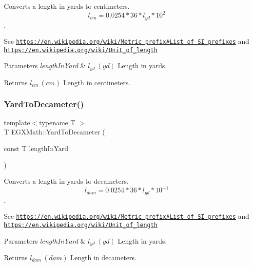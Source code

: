 Converts a length in yards to centimeters. \[ l_{cm}=0.0254 * 36 * l_{yd} * 10^{2} \]. 

See \href{https://en.wikipedia.org/wiki/Metric_prefix#List_of_SI_prefixes}{\tt https\+://en.\+wikipedia.\+org/wiki/\+Metric\+\_\+prefix\#\+List\+\_\+of\+\_\+\+S\+I\+\_\+prefixes} and \href{https://en.wikipedia.org/wiki/Unit_of_length}{\tt https\+://en.\+wikipedia.\+org/wiki/\+Unit\+\_\+of\+\_\+length} 
\begin{DoxyParams}{Parameters}
{\em length\+In\+Yard} & $ l_{yd}\ (yd)$ Length in yards. \\
\hline
\end{DoxyParams}
\begin{DoxyReturn}{Returns}
$ l_{cm}\ (cm)$ Length in centimeters. 
\end{DoxyReturn}
\mbox{\label{group___e_g_x_math-_conversions-_length_conversions-_imperial-_yard-_s_i_gafcf72603effbca33bde09d34475d88b4}} 
\subsubsection{\texorpdfstring{Yard\+To\+Decameter()}{YardToDecameter()}}
{\footnotesize\ttfamily template$<$typename T $>$ \\
T E\+G\+X\+Math\+::\+Yard\+To\+Decameter (\begin{DoxyParamCaption}\item[{const T}]{length\+In\+Yard }\end{DoxyParamCaption})}



Converts a length in yards to decameters. \[ l_{dam}=0.0254 * 36 * l_{yd} * 10^{-1} \]. 

See \href{https://en.wikipedia.org/wiki/Metric_prefix#List_of_SI_prefixes}{\tt https\+://en.\+wikipedia.\+org/wiki/\+Metric\+\_\+prefix\#\+List\+\_\+of\+\_\+\+S\+I\+\_\+prefixes} and \href{https://en.wikipedia.org/wiki/Unit_of_length}{\tt https\+://en.\+wikipedia.\+org/wiki/\+Unit\+\_\+of\+\_\+length} 
\begin{DoxyParams}{Parameters}
{\em length\+In\+Yard} & $ l_{yd}\ (yd)$ Length in yards. \\
\hline
\end{DoxyParams}
\begin{DoxyReturn}{Returns}
$ l_{dam}\ (dam)$ Length in decameters. 
\end{DoxyReturn}
\mbox{\label{group___e_g_x_math-_conversions-_length_conversions-_imperial-_yard-_s_i_ga2d9f995bf166959fcfdcceb61e6b6062}} 

